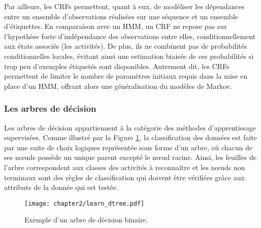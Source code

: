 Par ailleurs, les \acsp{CRF} permettent, quant à eux, de modéliser les dépendances entre un ensemble d'observations réalisées sur une séquence et un ensemble d'étiquettes. En comparaison avec un \acs{HMM}, un \acs{CRF} ne repose pas sur l'hypothèse forte d'indépendance des observations entre elles, conditionnellement aux états associés (les activités). De plus, ils ne combinent pas de probabilités conditionnelles locales, évitant ainsi une estimation biaisée de ces probabilités si trop peu d'exemples étiquetés sont disponibles. Autrement dit, les \acsp{CRF} permettent de limiter le nombre de paramètres initiaux requis dans la mise en place d'un \acs{HMM}, offrant alors une généralisation du modèles de Markov.

\subsubsection{Les arbres de décision}

Les arbres de décision appartiennent à la catégorie des méthodes d'apprentissage supervisées. Comme illustré par la Figure \ref{fig:learn_dtree}, la classification des données est faite par une suite de choix logiques représentée sous forme d'un arbre, où chacun de ses n\oe{}uds possède un unique parent excepté le n\oe{}ud racine. Ainsi, les feuilles de l'arbre correspondent aux classes des activités à reconnaître et les n\oe{}uds non terminaux sont des règles de classification qui doivent être vérifiées grâce aux attributs de la donnée qui est testée.

\begin{figure}[H]
	\centering
	\texttt{[image: chapter2/learn\_dtree.pdf]}
	\caption{Exemple d'un arbre de décision binaire.}
	\label{fig:learn_dtree}
\end{figure}

